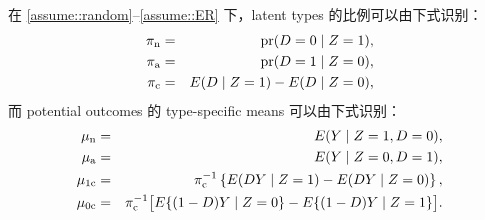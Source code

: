 \begin{theorem}
\label{thm::cace-mixture-components}
在 \cref{assume::random}--\cref{assume::ER} 下，latent types 的比例可以由下式识别：
\begin{eqnarray*}
 \pi_{\textup{n}} &=& \textup{pr}(D=0\mid Z=1)  ,\\
  \pi_{\textup{a}} &=&\textup{pr}(D=1\mid Z=0) , \\
  \pi_{\textup{c}} &=& E(D\mid Z=1) - E(D\mid Z=0) ,
\end{eqnarray*}
而 potential outcomes 的 type-specific means 可以由下式识别：
\begin{eqnarray*}
  \mu_{\textup{n}} &=& E(Y\mid Z=1, D=0) ,\\
 \mu_{\textup{a}} &=& E(Y\mid Z=0, D=1),\\
 \mu_{1\textup{c}} &=& \pi_{\textup{c}}^{-1}\left\{   E(DY\mid Z=1 )  -  E(DY\mid Z=0)    \right\}, \\
  \mu_{0\textup{c}}  &=& \pi_{\textup{c}}^{-1} \big[   E\{ (1-D)Y\mid Z=0 \}  -  E\{(1-D)Y\mid Z=1 \}    \big]. 
\end{eqnarray*}
\end{theorem}
 
